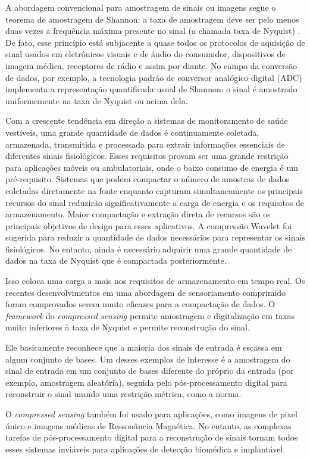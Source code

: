 \documentclass[a4paper, 12pt]{article}
\begin{document}
A abordagem convencional para amostragem de sinais ou imagens segue o teorema de amostragem de Shannon: a taxa de amostragem deve ser pelo menos duas vezes a frequência máxima presente no sinal (a chamada taxa de Nyquist) \cite{shannon}. De fato, esse princípio está subjacente a quase todos os protocolos de aquisição de sinal usados em eletrônicos visuais e de áudio do consumidor, dispositivos de imagem médica, receptores de rádio e assim por diante. No campo da conversão de dados, por exemplo, a tecnologia padrão de conversor analógico-digital (ADC) implementa a representação quantificada usual de Shannon: o sinal é amostrado uniformemente na taxa de Nyquist ou acima dela.

Com a crescente tendência em direção a sistemas de monitoramento de saúde vestíveis, uma grande quantidade de dados é continuamente coletada, armazenada, transmitida e processada para extrair informações essenciais de diferentes sinais fisiológicos. Esses requisitos provam ser uma grande restrição para aplicações móveis ou ambulatoriais, onde o baixo consumo de energia é um pré-requisito.
Sistemas que podem compactar o número de amostras de dados coletadas diretamente na fonte enquanto capturam simultaneamente os principais recursos do sinal reduzirão significativamente a carga de energia e os requisitos de armazenamento. Maior compactação e extração direta de recursos são os principais objetivos de design para esses aplicativos.
A compressão Wavelet foi sugerida para reduzir a quantidade de dados necessários para representar os sinais fisiológicos. No entanto, ainda é necessário adquirir uma grande quantidade de dados na taxa de Nyquist que é compactada posteriormente.

Isso coloca uma carga a mais nos requisitos de armazenamento em tempo real. Os recentes desenvolvimentos em uma abordagem de sensoriamento comprimido foram comprovados serem muito eficazes para a compactação de dados. O \textit{framework} do \textit{compressed sensing} permite amostragem e digitalização em taxas muito inferiores à taxa de Nyquist e permite reconstrução do sinal. 

Ele basicamente reconhece que a maioria dos sinais de entrada é escassa em algum conjunto de bases. Um desses exemplos de interesse é a amostragem do sinal de entrada em um conjunto de bases diferente do próprio da entrada (por exemplo, amostragem aleatória), seguida pelo pós-processamento digital para reconstruir o sinal usando uma restrição métrica, como a norma. 

O \textit{compressed sensing} também foi usado para aplicações, como imagens de pixel único e imagens médicas de Ressonância Magnética. No entanto, as complexas tarefas de pós-processamento digital para a reconstrução de sinais tornam todos esses sistemas inviáveis para aplicações de detecção biomédica e implantável.
\end{document}
